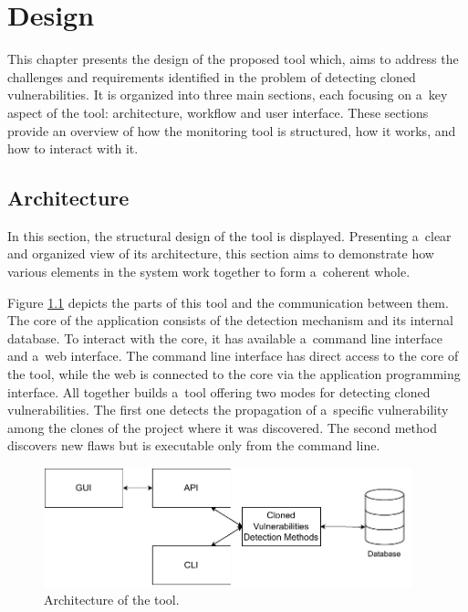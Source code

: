
\chapter{Design}
\label{chapter:design}
  This chapter presents the design of the proposed tool which, aims to address the challenges and requirements
  identified in the problem of detecting cloned vulnerabilities. It is organized into three main sections, each focusing
  on a~key aspect of the tool: architecture, workflow and user interface. These sections provide an overview
  of how the monitoring tool is structured, how it works, and how to interact with it.

  \section{Architecture}
  \label{section:architecture}
    In this section, the structural design of the tool is displayed. Presenting a~clear and organized
    view of its architecture, this section aims to demonstrate how various elements in the system work
    together to form a~coherent whole.

    Figure \ref{architecture} depicts the parts of this tool and the communication between them.
    The core of the application consists of the detection mechanism and its internal database. To interact
    with the core, it has available a~command line interface and a~web interface. The command line interface
    has direct access to the core of the tool, while the web is connected to the core via the application
    programming interface. All together builds a~tool offering two modes for detecting cloned vulnerabilities.
    The first one detects the propagation of a~specific vulnerability among the clones of the project where it was discovered.
    The second method discovers new flaws but is executable only from the command line.

    \bigskip

    \begin{figure}[h]
      \centering
      \includegraphics[width=0.95\textwidth]{obrazky-figures/architecture.drawio.pdf}
      \caption{Architecture of the tool.}
      \label{architecture}
    \end{figure}

